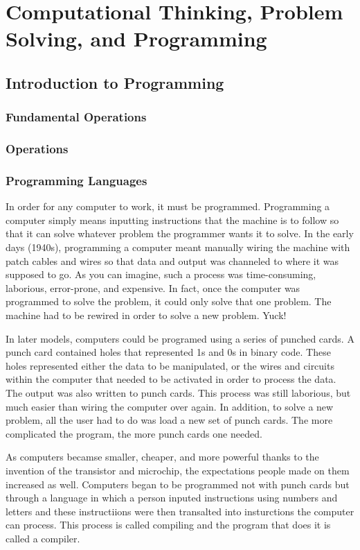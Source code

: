\chapter{Computational Thinking, Problem Solving, and Programming}

\section{Introduction to Programming}

\subsection*{Fundamental Operations}

\subsection*{Operations}

\subsection*{Programming Languages}

In order for any computer to work, it must be programmed. Programming a computer simply means inputting instructions that the machine is to follow so that it can solve whatever problem the programmer wants it to solve. In the early days (1940s), programming a computer meant manually wiring the machine with patch cables and wires so that data and output was channeled to where it was supposed to go. As you can imagine, such a process was time-consuming, laborious, error-prone, and expensive. In fact, once the computer was programmed to solve the problem, it could only solve that one problem. The machine had to be rewired in order to solve a new problem. Yuck!

In later models, computers could be programed using a series of punched cards. A punch card contained holes that represented 1s and 0s in binary code. These holes represented either the data to be manipulated, or the wires and circuits within the computer that needed to be activated in order to process the data. The output was also written to punch cards.  This process was still laborious, but much easier than wiring the computer over again. In addition, to solve a new problem, all the user had to do was load a new set of punch cards. The more complicated the program, the more punch cards one needed. 

As computers becamse smaller, cheaper, and more powerful thanks to the invention of the transistor and microchip, the expectations people made on them increased as well. Computers began to be programmed not with punch cards but through a language in which a person inputed instructions using numbers and letters and these instructiions were then transalted into insturctions the computer can process. This process is called compiling and the program that does it is called a compiler.

